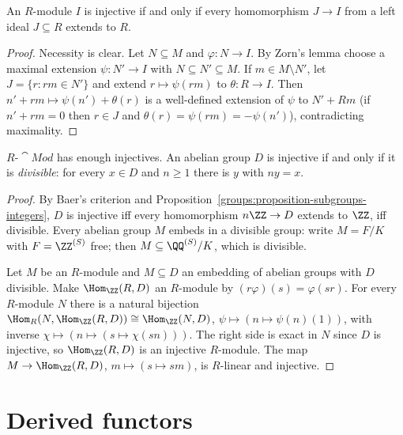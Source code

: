 \begin{proposition}\label{homological-algebra:proposition-baer}
An $R$-module $I$ is injective if and only if every homomorphism $J \to I$ from a left ideal $J \subseteq R$ extends to $R$.
\end{proposition}

\begin{proof}
Necessity is clear. Let $N \subseteq M$ and $\varphi \colon N \to I$. By Zorn's lemma choose a maximal extension
$\psi \colon N' \to I$ with $N \subseteq N' \subseteq M$. If $m \in M \setminus N'$, let $J = \{r : rm \in N'\}$ and extend
$r \mapsto \psi(rm)$ to $\theta \colon R \to I$. Then $n' + rm \mapsto \psi(n') + \theta(r)$ is a well-defined extension of $\psi$ to
$N' + Rm$ (if $n' + rm = 0$ then $r \in J$ and $\theta(r) = \psi(rm) = -\psi(n')$), contradicting maximality.
\end{proof}

\begin{theorem}\label{homological-algebra:theorem-enough-injectives}
$R\text{-}\cat{Mod}$ has enough injectives. An abelian group $D$ is injective if and only if it is \emph{divisible}: for every
$x \in D$ and $n \geq 1$ there is $y$ with $ny = x$.
\end{theorem}

\begin{proof}
By Baer's criterion and Proposition~\ref{groups:proposition-subgroups-integers}, $D$ is injective iff every homomorphism
$n\ZZ \to D$ extends to $\ZZ$, iff divisible. Every abelian group $M$ embeds in a divisible group: write $M = F/K$ with
$F = \ZZ^{(S)}$ free; then $M \subseteq \QQ^{(S)}/K$, which is divisible.

Let $M$ be an $R$-module and $M \subseteq D$ an embedding of abelian groups with $D$ divisible. Make $\Hom_\ZZ(R, D)$ an
$R$-module by $(r\varphi)(s) = \varphi(sr)$. For every $R$-module $N$ there is a natural bijection
$\Hom_R(N, \Hom_\ZZ(R, D)) \cong \Hom_\ZZ(N, D)$, $\psi \mapsto (n \mapsto \psi(n)(1))$, with inverse
$\chi \mapsto (n \mapsto (s \mapsto \chi(sn)))$. The right side is exact in $N$ since $D$ is injective, so $\Hom_\ZZ(R, D)$ is an
injective $R$-module. The map $M \to \Hom_\ZZ(R, D)$, $m \mapsto (s \mapsto sm)$, is $R$-linear and injective.
\end{proof}

\section{Derived functors}\label{homological-algebra:section-derived-functors}

